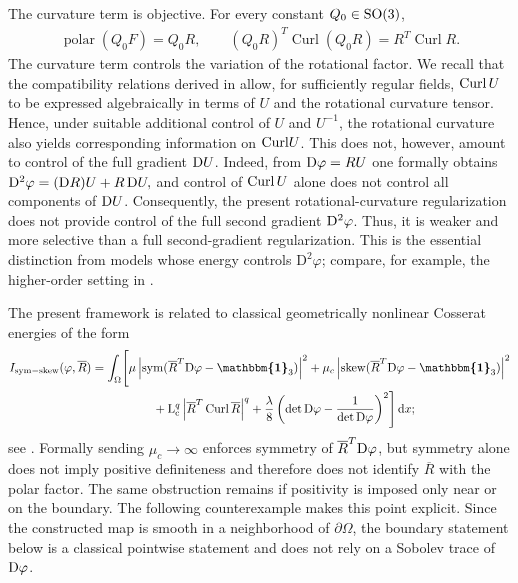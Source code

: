 \documentclass[11pt]{article}
\newcommand{\id}{{\boldsymbol{\mathbbm{1}}}}
\newcommand{\Curl}{{\rm Curl}}
\begin{document}
The curvature term is objective. For every constant $Q_0\in {\rm SO}(3)$,
\begin{align}
\operatorname{polar}(Q_0F)=Q_0 R,
\qquad
(Q_0 R)^T\operatorname{Curl}(Q_0 R)
=
 R^T\operatorname{Curl}  R.
\end{align}
 {The curvature term controls the variation of the rotational factor.
We recall that the compatibility relations derived in
\cite{LankeitNeffOsterbrink2017} allow, for sufficiently regular fields,
$\Curl \,U$ to be expressed algebraically in terms of $U$ and the rotational
curvature tensor. Hence, under suitable additional control of $U$ and
$U^{-1}$, the rotational curvature also yields corresponding information
on $\Curl U$.
This does not, however, amount to control of the full gradient ${\rm D}U$.
Indeed, from
$
{\rm D}\varphi=RU
$
one formally obtains
$
{\rm D}^2\varphi=({\rm D}R)U+R\,{\rm D}U,
$
and control of $\Curl \,U$ alone does not control all components of
${\rm D}U$. Consequently, the present rotational-curvature regularization
does not provide control of the full second gradient ${\rm D}^2\varphi$.
}
 Thus, it is weaker and more selective than a full second-gradient regularization. This is the essential distinction from models whose energy controls $\mathrm D^2\varphi$; compare, for example, the higher-order setting in \cite{vcevsik2025stability}.

The present framework is related to classical geometrically nonlinear Cosserat energies of the form
\begin{align}
\label{minprobc}
I_{\rm sym-skew}(\varphi, \overline R )
=
\int_\Omega\Biggl[
&\mu\left|\operatorname{sym}( \overline R ^T{\rm D}\varphi-\id_3)\right|^2
+
\mu_c\left|\operatorname{skew}( \overline R ^T{\rm D}\varphi-\id_3)\right|^2
\notag\\
&\qquad  +{\rm L}_{\rm c}^q \left| \overline R ^T\operatorname{Curl} \overline R \right|^q
+
\frac\lambda8
\left(\det{\rm D}\varphi-\frac1{\det{\rm D}\varphi}\right)^2
\Biggr] \,\mathrm dx;
\end{align}
see \cite{NeffSolid2004,neff2014existence,Neff_plate04_cmt,Neff_Chelminski_ifb07}. Formally sending $\mu_c\to\infty$ enforces symmetry of $ \overline R ^T{\rm D}\varphi$, but symmetry alone does not imply positive definiteness and therefore does not identify $\overline  R $ with the polar factor. The same obstruction remains if positivity is imposed only near or on the boundary. The following counterexample makes this point explicit. Since the constructed map is smooth in a neighborhood of $\partial\Omega$, the boundary statement below is a classical pointwise statement and does not rely on a Sobolev trace of ${\rm D}\varphi$.
\end{document}
